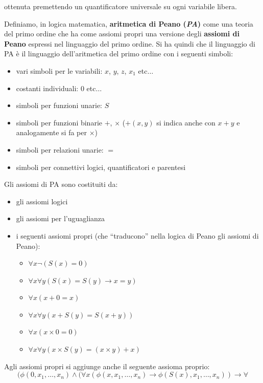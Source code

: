 \documentclass[a4paper,12pt, oneside]{book}
\begin{document}
\begin{shaded}
\begin{definizione}
    ottenuta premettendo un quantificatore universale su ogni variabile libera. 
  \end{definizione}
  \begin{definizione}
    Definiamo, in logica matematica, \textbf{aritmetica di Peano (\textit{PA})}
    come una teoria del primo 
    ordine che ha come assiomi propri una versione degli \textbf{assiomi di
      Peano} 
    espressi nel linguaggio del primo ordine. Si ha quindi che il linguaggio di
    PA 
    è il linguaggio dell'aritmetica del primo ordine con i seguenti simboli:
    \begin{itemize}
      \item vari simboli per le variabili: $x$, $y$, $z$, $x_1$ etc$\ldots$
      \item costanti individuali: $0$ etc$\ldots$
      \item simboli per funzioni unarie: $S$
      \item simboli per funzioni binarie $+$, $\times$ ($+(x,y)$ si indica anche
      con $x+y$ e analogamente si fa per $\times$)
      \item simboli per relazioni unarie: $=$
      \item simboli per connettivi logici, quantificatori e parentesi
    \end{itemize}
    Gli assiomi di PA sono costituiti da:
    \begin{itemize}
      \item gli assiomi logici
      \item gli assiomi per l'uguaglianza
      \item i seguenti assiomi propri (che ``traducono'' nella logica di Peano
      gli assiomi di Peano):
      \begin{itemize}
        \item $\forall x\neg(S(x)=0)$
        \item $\forall x\forall y(S(x)=S(y)\to x=y)$
        \item $\forall x(x+0=x)$
        \item $\forall x\forall y(x+S(y)=S(x+y))$
        \item $\forall x(x\times 0 =0)$
        \item $\forall x\forall y(x\times S(y)=(x\times y)+x)$
      \end{itemize}
    \end{itemize}
    Agli assiomi propri si aggiunge anche il seguente assioma proprio:
    {\footnotesize{\[(\phi(0,x_1,\ldots,x_n)\land(\forall
      x(\phi(x,x_1,\ldots,x_n)\to\phi(S(x),x_1,\ldots,x_n))\to\forall 
\]}}
\end{definizione}
\end{shaded}
\end{document}
